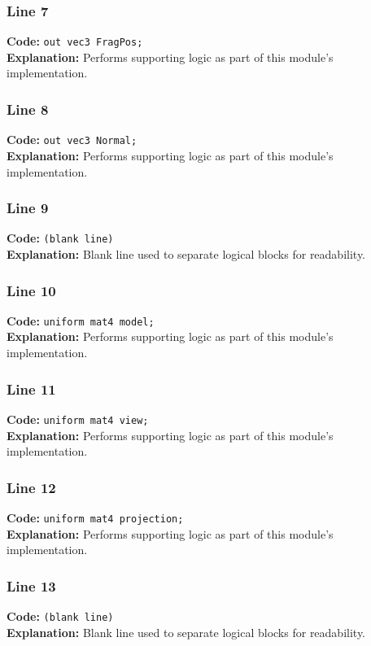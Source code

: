 \documentclass[11pt,a4paper]{article}
\begin{document}
\subsubsection*{Line 7}
\textbf{Code:} \verb|out vec3 FragPos;|\\
\textbf{Explanation:} Performs supporting logic as part of this module's implementation.

\subsubsection*{Line 8}
\textbf{Code:} \verb|out vec3 Normal;|\\
\textbf{Explanation:} Performs supporting logic as part of this module's implementation.

\subsubsection*{Line 9}
\textbf{Code:} \texttt{(blank line)}\\
\textbf{Explanation:} Blank line used to separate logical blocks for readability.

\subsubsection*{Line 10}
\textbf{Code:} \verb|uniform mat4 model;|\\
\textbf{Explanation:} Performs supporting logic as part of this module's implementation.

\subsubsection*{Line 11}
\textbf{Code:} \verb|uniform mat4 view;|\\
\textbf{Explanation:} Performs supporting logic as part of this module's implementation.

\subsubsection*{Line 12}
\textbf{Code:} \verb|uniform mat4 projection;|\\
\textbf{Explanation:} Performs supporting logic as part of this module's implementation.

\subsubsection*{Line 13}
\textbf{Code:} \texttt{(blank line)}\\
\textbf{Explanation:} Blank line used to separate logical blocks for readability.
\end{document}
